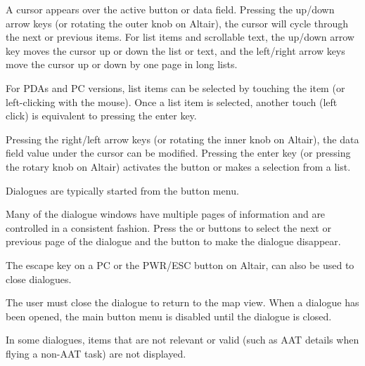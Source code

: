 A cursor appears over the active button or data field. Pressing the up/down
arrow keys (or rotating the outer knob on Altair), the cursor will cycle
through the next or previous items. For list items and scrollable text, the
up/down arrow key moves the cursor up or down the list or text, and the
left/right arrow keys move the cursor up or down by one page in long lists.

For PDAs and PC versions, list items can be selected by touching the item (or
left-clicking with the mouse). Once a list item is selected, another touch
(left click) is equivalent to pressing the enter key.

Pressing the right/left arrow keys (or rotating the inner knob on Altair), the
data field value under the cursor can be modified. Pressing the enter key (or
pressing the rotary knob on Altair) activates the button or makes a selection
from a list.

Dialogues are typically started from the button menu.

Many of the dialogue windows have multiple pages of information and are controlled
in a consistent fashion. Press the \button{$<$} or \button{$>$} buttons to
select the next or previous page of the dialogue and the  button to
make the dialogue disappear.

The escape key on a PC or the PWR/ESC button on Altair, can also be used to
close dialogues.

The user must close the dialogue to return to the map view. When a dialogue
has been opened, the main button menu is disabled until the dialogue is closed.

In some dialogues, items that are not relevant or valid (such as AAT details when
flying a non-AAT task) are not displayed.

